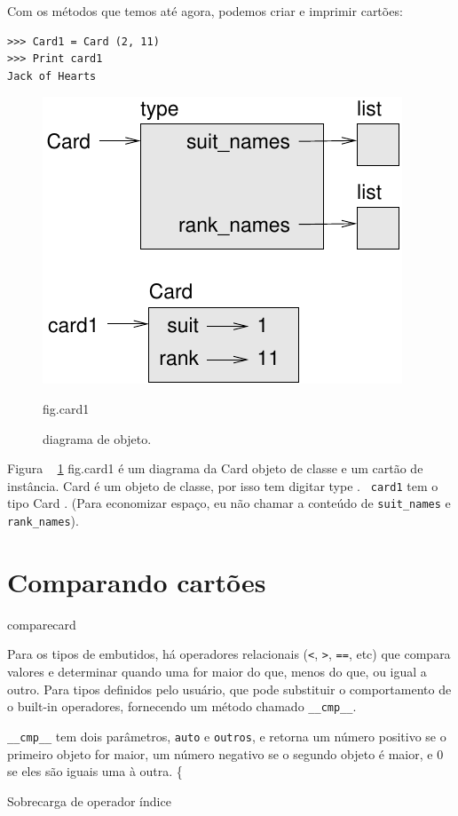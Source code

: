 \documentclass[10pt]{book}
\begin{document}
\begin{exercise}
\begin{v erbatim}
{Com os métodos que temos até agora, podemos criar e imprimir cartões:

\begin{verbatim}
>>> Card1 = Card (2, 11)
>>> Print card1
Jack of Hearts
\end{verbatim}

\begin{figure}
\centerline
{\includegraphics[scale = 0.8] {figs/card1.pdf}}
\caption{diagrama de objeto.}
\label{} fig.card1
\end{figure}

Figura ~ \ref {} fig.card1 é um diagrama da {Card \tt} objeto de classe
e um cartão de instância.
{Card \tt} é um objeto de classe, por isso tem digitar {type \tt}. {\tt
card1} tem o tipo {Card \tt}. (Para economizar espaço, eu não chamar a
conteúdo de \verb "suit_names" e \verb "rank_names").


\section{Comparando cartões}
\label{} comparecard

Para os tipos de embutidos, há operadores relacionais
({\tt <}, {\tt>}, {\tt ==}, etc)
que compara
valores e determinar quando uma for maior do que, menos do que, ou igual a
outro. Para tipos definidos pelo usuário, que pode substituir o comportamento de
o built-in operadores, fornecendo um método chamado
\Verb "__cmp__".  

\Verb "__cmp__" tem dois parâmetros, {\tt auto} e {\tt outros},
e retorna um número positivo se o primeiro objeto for maior, um
número negativo se o segundo objeto é maior, e 0 se eles são
iguais uma à outra.
\{} Sobrecarga de operador índice


\end{v erbatim}
\end{exercise}
\end{document}
